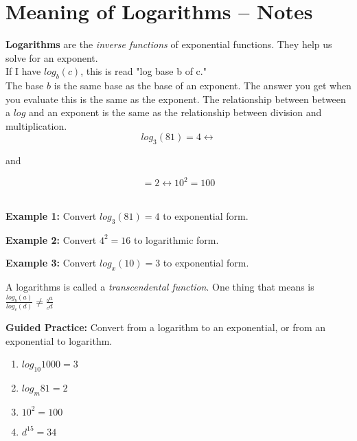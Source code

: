 \documentclass[12pt]{article}
\begin{document}
\section{Meaning of Logarithms -- Notes}

\textbf{Logarithms} are the \textit{inverse functions} of exponential functions. They help us solve for an exponent.\\

If I have $log_{b}(c)$, this is read "log base b of c."\\

The base $b$ is the same base as the base of an exponent. The answer you get when you evaluate this is the same as the exponent. The relationship between between a $log$ and an exponent is the same as the relationship between division and multiplication.\\

$$log_{3}(81)=4 \longleftrightarrow $$

and

$$=2 \longleftrightarrow 10^2=100$$\\

\hrulefill

\textbf{Example 1:} Convert $log_{3}(81)=4$ to exponential form.\\

\vspace{1cm}

\textbf{Example 2:} Convert $4^2=16$ to logarithmic form.\\

\vspace{1cm}

\textbf{Example 3:} Convert $log_{x}(10)=3$ to exponential form.\\

\vspace{1cm}

A logarithms is called a \textit{transcendental function}. One thing that means is $\frac{log_{b}(a)}{log_{c}(d)} \neq \frac{_ba}{_cd}$\\

\hrulefill

\textbf{Guided Practice:} Convert from a logarithm to an exponential, or from an exponential to logarithm.\\

\begin{multicols}{2}
\begin{enumerate}
	\setlength\itemsep{1cm}
	
	\item $log_{10}1000=3$\\
	
	\item $log_m{81}=2$\\
	
	\item $10^{2}=100$\\
	
	\item $d^{15}=34$\\

\end{enumerate}
\end{multicols}
\end{document}
